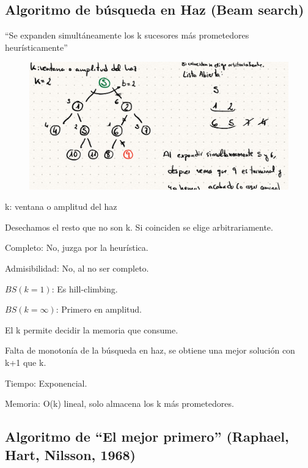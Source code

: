 \documentclass[12pt, twoside, openright]{report} %
\begin{document}
\subsection{Algoritmo de búsqueda en Haz (Beam search)}

  ``Se expanden simultáneamente los k sucesores más prometedores
  heurísticamente''
  \begin{figure}[H]
	{\includegraphics[scale=.22]{Untitled 54.png}}
\end{figure}
 
    k: ventana o amplitud del haz

	Desechamos el resto que no son k. Si coinciden se elige
    arbitrariamente.

	Completo: No, juzga por la heurística.

	Admisibilidad: No, al no ser completo.

	\(BS(k=1)\): Es hill-climbing.

	\(BS(k= \infty)\): Primero en amplitud.

	El k permite decidir la memoria que consume.

	Falta de monotonía de la búsqueda en haz, se obtiene una mejor
    solución con k+1 que k.

	Tiempo: Exponencial.

	Memoria: O(k) lineal, solo almacena los k más prometedores.

	
\subsection{Algoritmo de ``El mejor primero'' (Raphael, Hart, Nilsson, 1968)}
  
\end{document}
